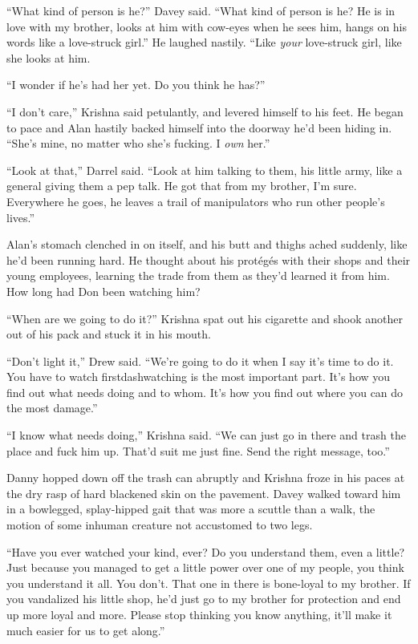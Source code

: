 ``What kind of person is he?'' Davey said.  ``What kind of person is
he?  He is in love with my brother, looks at him with cow-eyes when he
sees him, hangs on his words like a love-struck girl.'' He laughed
nastily.  ``Like \textit{your} love-struck girl, like she looks at
him.

``I wonder if he's had her yet.  Do you think he has?''

``I don't care,'' Krishna said petulantly, and levered himself to his
feet.  He began to pace and Alan hastily backed himself into the
doorway he'd been hiding in.  ``She's mine, no matter who she's
fucking.  I \textit{own} her.''

``Look at that,'' Darrel said.  ``Look at him talking to them, his
little army, like a general giving them a pep talk.  He got that from
my brother, I'm sure.  Everywhere he goes, he leaves a trail of
manipulators who run other people's lives.''

Alan's stomach clenched in on itself, and his butt and thighs ached
suddenly, like he'd been running hard.  He thought about his
prot\'{e}g\'{e}s with their shops and their young employees, learning
the trade from them as they'd learned it from him.  How long had Don
been watching him?

``When are we going to do it?'' Krishna spat out his cigarette and
shook another out of his pack and stuck it in his mouth.

``Don't light it,'' Drew said.  ``We're going to do it when I say it's
time to do it.  You have to watch firstdash{}watching is the most
important part.  It's how you find out what needs doing and to whom. 
It's how you find out where you can do the most damage.''

``I know what needs doing,'' Krishna said.  ``We can just go in there
and trash the place and fuck him up.  That'd suit me just fine.  Send
the right message, too.''

Danny hopped down off the trash can abruptly and Krishna froze in his
paces at the dry rasp of hard blackened skin on the pavement.  Davey
walked toward him in a bowlegged, splay-hipped gait that was more a
scuttle than a walk, the motion of some inhuman creature not
accustomed to two legs.

``Have you ever watched your kind, ever?  Do you understand them, even
a little?  Just because you managed to get a little power over one of
my people, you think you understand it all.  You don't.  That one in
there is bone-loyal to my brother.  If you vandalized his little shop,
he'd just go to my brother for protection and end up more loyal and
more.  Please stop thinking you know anything, it'll make it much
easier for us to get along.''

